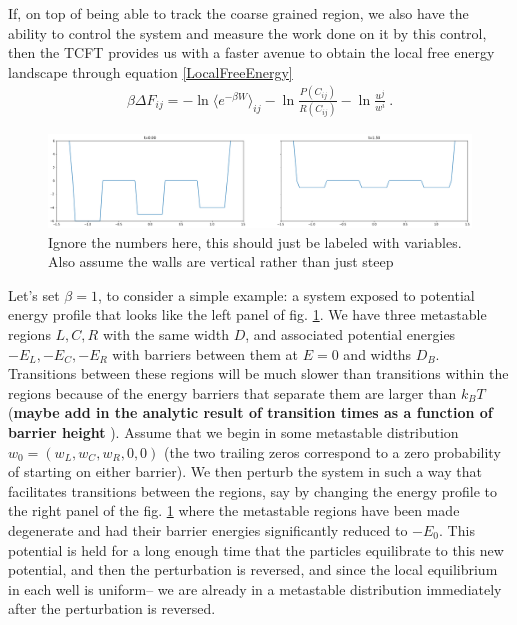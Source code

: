 \documentclass[paper=a4, fontsize=10pt]{article} %
\numberwithin{equation}{section} %
\numberwithin{figure}{section} %
\numberwithin{table}{section} %
\def\tbf #1{\textbf{#1} }
\def\avg#1{\langle #1 \rangle}
\begin{document}
If, on top of being able to track the coarse grained region, we also have the ability to control the system and measure the work done on it by this control, then the TCFT provides us with a faster avenue to obtain the local free energy landscape through equation \ref{LocalFreeEnergy}
\begin{align}
\beta \Delta F_{ij} =  -\ln \avg{e^{-\beta W }}_{ij}- \ln \frac{P(C_{ij})}{R(C_{ij})} - \ln \frac{u^j}{w^i} 
~. 
\end{align}

\begin{figure}
\includegraphics[width=\columnwidth, trim=0 0 0 0, clip]{square_trip.png}
\centering
\caption{Ignore the numbers here, this should just be labeled with variables. Also assume the walls are vertical rather than just steep}
\label{fig:SquareTrip}
\end{figure}

Let's set $\beta=1$, to consider a simple example: a system exposed to potential energy profile that looks like the left panel of fig. \ref{fig:SquareTrip}. We have three metastable regions $L,C,R$ with the same width $D$, and associated potential energies $-E_L, -E_C, -E_R$ with barriers between them at $E=0$ and widths $D_B$. Transitions between these regions will be much slower than transitions within the regions because of the energy barriers that separate them are larger than $k_B T$ (\tbf{maybe add in the analytic result of transition times as a function of barrier height}). Assume that we begin in some metastable distribution $w_0 = (w_L, w_C, w_R, 0, 0)$ (the two trailing zeros correspond to a zero probability of starting on either barrier). We then perturb the system in such a way that facilitates transitions between the regions, say by changing the energy profile to the right panel of the fig. \ref{fig:SquareTrip} where the metastable regions have been made degenerate and had their barrier energies significantly reduced to $-E_0$. This potential is held for a long enough time that the particles equilibrate to this new potential, and then the perturbation is reversed, and since the local equilibrium in each well is uniform-- we are already in a metastable distribution immediately after the perturbation is reversed.
\end{document}
